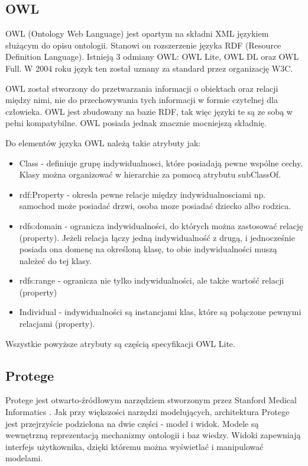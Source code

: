 \subsection{OWL}
\label{sec:owl}

OWL (Ontology Web Language) jest opartym na składni XML językiem służącym do opisu ontologii. Stanowi on rozszerzenie języka RDF (Resource Definition Language). Istnieją 3 odmiany OWL: OWL Lite, OWL DL oraz OWL Full. W 2004 roku język ten został uznany za standard przez organizację W3C. \cite {8}

OWL został stworzony do przetwarzania informacji o obiektach oraz relacji między nimi, nie do przechowywania tych informacji w formie czytelnej dla człowieka. OWL jest zbudowany na bazie RDF, tak więc języki te są ze sobą w pełni kompatybilne. OWL posiada jednak znacznie mocniejszą składnię.

Do elementów języka OWL należą takie atrybuty jak:

\begin{itemize}

\item Class - definiuje grupę indywidualnosci, które posiadają pewne wspólne cechy. Klasy można organizować w hierarchie za pomocą atrybutu subClassOf.


\item rdf:Property - okresla pewne relacje między indywidualnosciami np. samochod może posiadać drzwi, osoba moze posiadać dziecko albo rodzica.

\item rdfs:domain - ogranicza indywidualności, do których można zastosować relację (property). Jeżeli relacja łączy jedną indywidualność z drugą, i jednocześnie posiada ona domenę na określoną klasę, to obie indywidualności muszą należeć do tej klasy.

\item rdfs:range - ogranicza nie tylko indywidualności, ale także wartość relacji (property)

\item Individual - indywidualności są instancjami klas, które są połączone pewnymi relacjami (property).

\end{itemize}

Wszystkie powyższe atrybuty są częścią specyfikacji OWL Lite.

\subsection{Protege}
\label{sec:protege}
Protege jest otwarto-źródłowym narzędziem stworzonym przez Stanford Medical Informatics \cite{26}. Jak przy większości narzędzi modelujących, architektura Protege jest przejrzyście podzielona na dwie części - model i widok. Modele są wewnętrzną reprezentacją mechanizmy ontologii i baz wiedzy. Widoki zapewniają interfejs użytkownika, dzięki któremu można wyświetlać i manipulować modelami.

